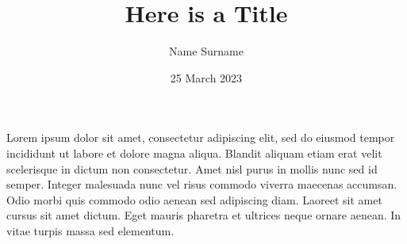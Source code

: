 \documentclass{article}
\title{Here is a Title}
\author{Name Surname}
\date{25 March 2023}
\begin{document}
\maketitle

Lorem ipsum dolor sit amet, consectetur adipiscing elit, sed do eiusmod tempor incididunt ut labore et dolore magna aliqua. Blandit aliquam etiam erat velit scelerisque in dictum non consectetur. Amet nisl purus in mollis nunc sed id semper. Integer malesuada nunc vel risus commodo viverra maecenas accumsan. Odio morbi quis commodo odio aenean sed adipiscing diam. Laoreet sit amet cursus sit amet dictum. Eget mauris pharetra et ultrices neque ornare aenean. In vitae turpis massa sed elementum.
\end{document}
